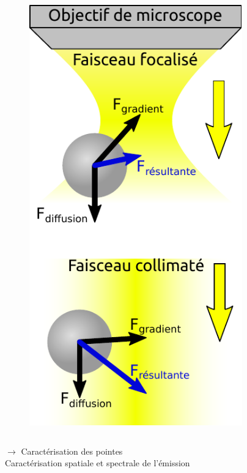 \documentclass[9pt,a9paper,handout]{beamer}
\begin{document}
\begin{frame}
\begin{columns}[T]
\begin{column}{0.3\textwidth}
\begin{figure}[H]
                \includegraphics[width=0.82\textwidth]{Images/Schemas/FaisceauConfinement}
            \end{figure}
        \end{column}
        \end{columns}


    \vspace*{5mm}
        {\large $\rightarrow$ Caractérisation des pointes} \vspace*{1mm}\\
        \qquad Caractérisation spatiale et spectrale de l'émission

    \end{frame}
\end{document}
